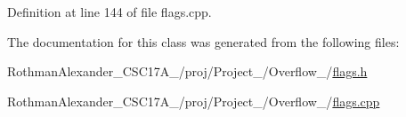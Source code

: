 Definition at line 144 of file flags.\+cpp.



The documentation for this class was generated from the following files\+:\begin{DoxyCompactItemize}
\item 
Rothman\+Alexander\+\_\+\+C\+S\+C17\+A\+\_/proj/\+Project\+\_/\+Overflow\+\_/\hyperlink{flags_8h}{flags.\+h}\item 
Rothman\+Alexander\+\_\+\+C\+S\+C17\+A\+\_/proj/\+Project\+\_/\+Overflow\+\_/\hyperlink{flags_8cpp}{flags.\+cpp}\end{DoxyCompactItemize}
